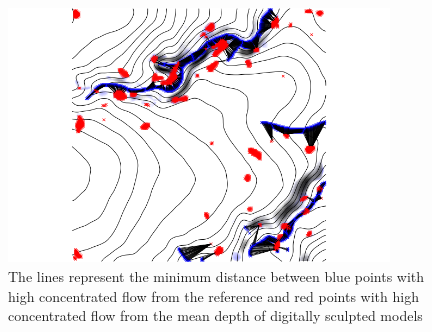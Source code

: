 \documentclass{isprs}
\begin{document}
%
%
%
\begin{figure}
\begin{center}
\includegraphics[width=0.9\textwidth]{figures/concentrated_flow_1.png}
\caption{
The lines represent the minimum distance between blue points with high concentrated flow from the reference and red points with high concentrated flow from the mean depth of digitally sculpted models}
\label{fig:distance_1}
\end{center}
\end{figure}
%
\end{document}

